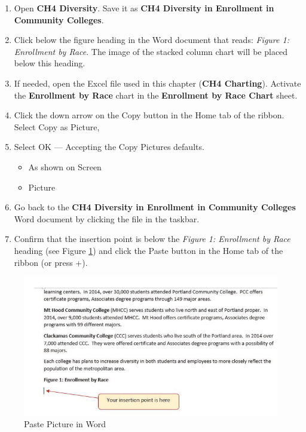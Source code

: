 \begin{enumerate}
	\item Open \textbf{CH4 Diversity}. Save it as \textbf{CH4 Diversity in Enrollment in Community Colleges}.
	\item Click below the figure heading in the Word document that reads: \textit{Figure 1: Enrollment by Race}. The image of the stacked column chart will be placed below this heading.
	\item If needed, open the Excel file used in this chapter (\textbf{CH4 Charting}). Activate the \textbf{Enrollment by Race} chart in the \textbf{Enrollment by Race Chart} sheet.
	\item Click the down arrow on the Copy button in the Home tab of the ribbon. Select Copy as Picture,
	\item Select OK --- Accepting the Copy Pictures defaults.
	
	\begin{itemize}
		\item As shown on Screen
		\item Picture
	\end{itemize}	

	\item Go back to the \textbf{CH4 Diversity in Enrollment in Community Colleges} Word document by clicking the file in the taskbar.
	\item Confirm that the insertion point is below the \textit{Figure 1: Enrollment by Race} heading (see Figure \ref{04:fig43}) and click the Paste button in the Home tab of the ribbon (or press +).
\end{enumerate}

\begin{figure}[H]
	\centering
	\includegraphics[width=\maxwidth{.95\linewidth}]{gfx/ch04_fig43}
	\caption{Paste Picture in Word}
	\label{04:fig43}
\end{figure}

